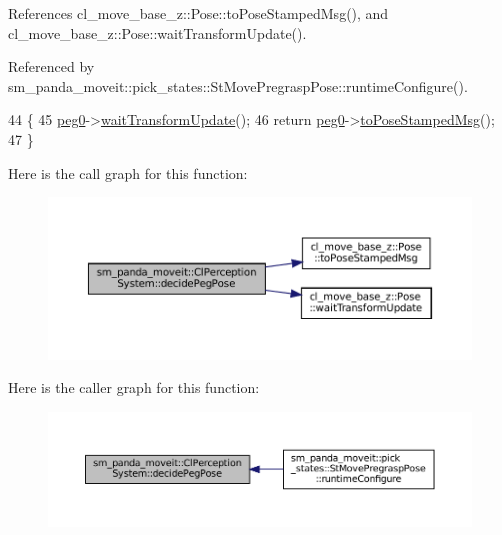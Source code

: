 References cl\+\_\+move\+\_\+base\+\_\+z\+::\+Pose\+::to\+Pose\+Stamped\+Msg(), and cl\+\_\+move\+\_\+base\+\_\+z\+::\+Pose\+::wait\+Transform\+Update().



Referenced by sm\+\_\+panda\+\_\+moveit\+::pick\+\_\+states\+::\+St\+Move\+Pregrasp\+Pose\+::runtime\+Configure().


\begin{DoxyCode}
44     \{
45         \hyperlink{classsm__panda__moveit_1_1ClPerceptionSystem_a41bf0f3e7549ef608c92dbe7b592b7bc}{peg0}->\hyperlink{classcl__move__base__z_1_1Pose_a5f8576c3dacfb2f2e7f9df5105c480ea}{waitTransformUpdate}();
46         \textcolor{keywordflow}{return} \hyperlink{classsm__panda__moveit_1_1ClPerceptionSystem_a41bf0f3e7549ef608c92dbe7b592b7bc}{peg0}->\hyperlink{classcl__move__base__z_1_1Pose_a63887a88c1ac6e9a4a71b8d7d11aed6c}{toPoseStampedMsg}();
47     \}
\end{DoxyCode}
Here is the call graph for this function\+:
\nopagebreak
\begin{figure}[H]
\begin{center}
\leavevmode
\includegraphics[width=350pt]{classsm__panda__moveit_1_1ClPerceptionSystem_af90368e6bddd4bda759f6b859c0b37e6_cgraph}
\end{center}
\end{figure}
Here is the caller graph for this function\+:
\nopagebreak
\begin{figure}[H]
\begin{center}
\leavevmode
\includegraphics[width=350pt]{classsm__panda__moveit_1_1ClPerceptionSystem_af90368e6bddd4bda759f6b859c0b37e6_icgraph}
\end{center}
\end{figure}
\mbox{\label{classsm__panda__moveit_1_1ClPerceptionSystem_a017fd058419a7279487da03d180bb2d2}} 
